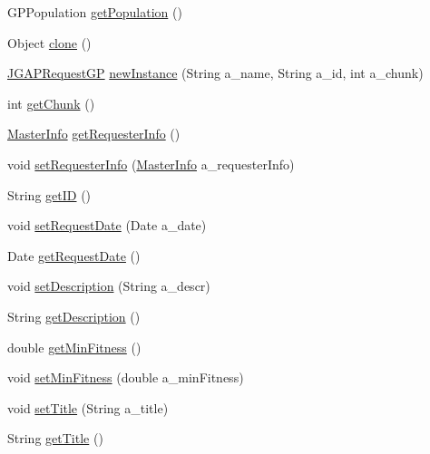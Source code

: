 \begin{DoxyCompactItemize}
\item 
G\-P\-Population \hyperlink{classorg_1_1jgap_1_1distr_1_1grid_1_1gp_1_1_j_g_a_p_request_g_p_a4dcb905c738712c8b41241629341e1d8}{get\-Population} ()
\item 
Object \hyperlink{classorg_1_1jgap_1_1distr_1_1grid_1_1gp_1_1_j_g_a_p_request_g_p_aa219a90da3775fd26d6644ce7369305f}{clone} ()
\item 
\hyperlink{classorg_1_1jgap_1_1distr_1_1grid_1_1gp_1_1_j_g_a_p_request_g_p}{J\-G\-A\-P\-Request\-G\-P} \hyperlink{classorg_1_1jgap_1_1distr_1_1grid_1_1gp_1_1_j_g_a_p_request_g_p_a356cc1ffb6831019794361715548f084}{new\-Instance} (String a\-\_\-name, String a\-\_\-id, int a\-\_\-chunk)
\item 
int \hyperlink{classorg_1_1jgap_1_1distr_1_1grid_1_1gp_1_1_j_g_a_p_request_g_p_a45deb678d9e2c722725533d055b93a6d}{get\-Chunk} ()
\item 
\hyperlink{classorg_1_1jgap_1_1distr_1_1_master_info}{Master\-Info} \hyperlink{classorg_1_1jgap_1_1distr_1_1grid_1_1gp_1_1_j_g_a_p_request_g_p_a8e67e2a3da8357e9fe5408d06cd9505e}{get\-Requester\-Info} ()
\item 
void \hyperlink{classorg_1_1jgap_1_1distr_1_1grid_1_1gp_1_1_j_g_a_p_request_g_p_a2cf43620f9415912b415ceee7c7da6aa}{set\-Requester\-Info} (\hyperlink{classorg_1_1jgap_1_1distr_1_1_master_info}{Master\-Info} a\-\_\-requester\-Info)
\item 
String \hyperlink{classorg_1_1jgap_1_1distr_1_1grid_1_1gp_1_1_j_g_a_p_request_g_p_ae8d13abeabf884a046bc314f9b0a8180}{get\-I\-D} ()
\item 
void \hyperlink{classorg_1_1jgap_1_1distr_1_1grid_1_1gp_1_1_j_g_a_p_request_g_p_a1c791fe8304a9d6b98748473cf635a0c}{set\-Request\-Date} (Date a\-\_\-date)
\item 
Date \hyperlink{classorg_1_1jgap_1_1distr_1_1grid_1_1gp_1_1_j_g_a_p_request_g_p_a0bae2029554784f7a9f110471cd995e1}{get\-Request\-Date} ()
\item 
void \hyperlink{classorg_1_1jgap_1_1distr_1_1grid_1_1gp_1_1_j_g_a_p_request_g_p_a90d3d74d2867e03e8cebefb1ecc493cc}{set\-Description} (String a\-\_\-descr)
\item 
String \hyperlink{classorg_1_1jgap_1_1distr_1_1grid_1_1gp_1_1_j_g_a_p_request_g_p_ac8e0ba21789c7e1290df07f60d2c70a1}{get\-Description} ()
\item 
double \hyperlink{classorg_1_1jgap_1_1distr_1_1grid_1_1gp_1_1_j_g_a_p_request_g_p_acfcfdbd413fe78159c751ae9e1465041}{get\-Min\-Fitness} ()
\item 
void \hyperlink{classorg_1_1jgap_1_1distr_1_1grid_1_1gp_1_1_j_g_a_p_request_g_p_a056927716850f061f7f83fb065d0f1ef}{set\-Min\-Fitness} (double a\-\_\-min\-Fitness)
\item 
void \hyperlink{classorg_1_1jgap_1_1distr_1_1grid_1_1gp_1_1_j_g_a_p_request_g_p_a7f2d71aae7dde30ac8ac3b339acd481f}{set\-Title} (String a\-\_\-title)
\item 
String \hyperlink{classorg_1_1jgap_1_1distr_1_1grid_1_1gp_1_1_j_g_a_p_request_g_p_a4ab723c1744e0a0d01d6a15d004476df}{get\-Title} ()
\end{DoxyCompactItemize}
